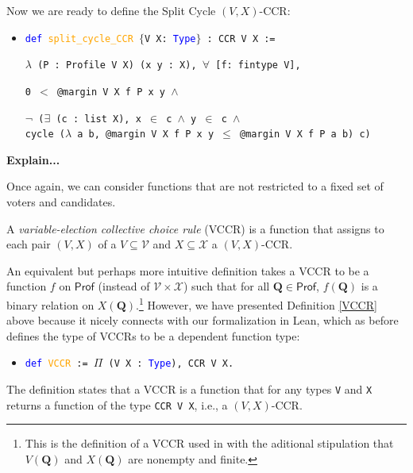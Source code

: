 \documentclass[runningheads]{llncs}
\begin{document}
\begin{example}
Now we are ready to define the Split Cycle $(V,X)$-CCR:
\begin{itemize}
\item[] \texttt{\textcolor{blue}{def} \textcolor{orange}{split\_cycle\_CCR} $\{$V X: \textcolor{blue}{Type}$\}$ : CCR V X :=} 

    \texttt{$\lambda$ (P : Profile V X) (x y : X), $\forall$ [f: fintype V],}
    
    \texttt{0 $<$ @margin V X f P x y $\wedge$}
    
    \texttt{$\neg$ ($\exists$ (c : list X), x $\in$ c $\wedge$ y $\in$ c $\wedge$}\\
    \texttt{cycle ($\lambda$ a b, @margin V X f P x y $\leq$ @margin V X f P a b) c)}
\end{itemize}
\textbf{Explain...}


\end{example}

Once again, we can consider functions that are not restricted to a fixed set of voters and candidates.

\begin{definition}\label{VCCR} \textnormal{A \emph{variable-election collective choice rule} (VCCR) is a function that assigns to each pair $(V,X)$ of a $V\subseteq\mathcal{V}$ and $X\subseteq\mathcal{X}$ a $(V,X)$-CCR.}%
\end{definition}

\noindent An equivalent but perhaps more intuitive definition takes a VCCR to be a function $f$ on $\mathsf{Prof}$ (instead of $\mathcal{V}\times\mathcal{X}$) such that for all $\mathbf{Q}\in\mathsf{Prof}$, $f(\mathbf{Q})$ is a binary relation on $X(\mathbf{Q})$.\footnote{This is the definition of a VCCR used in \cite{} with the aditional stipulation that $V(\mathbf{Q})$ and $X(\mathbf{Q})$ are nonempty and finite.} However, we have presented Definition \ref{VCCR} above because it nicely connects with our formalization in Lean, which as before defines the type of VCCRs to be a dependent function type:
\begin{itemize}
\item[] \texttt{\textcolor{blue}{def} \textcolor{orange}{VCCR} := $\Pi$ (V X : \textcolor{blue}{Type}), CCR V X.}
\end{itemize}
The definition states that a VCCR is a function that for any types \texttt{V} and \texttt{X} returns a function of the type \texttt{CCR V X}, i.e., a $(V,X)$-CCR.
\end{document}
